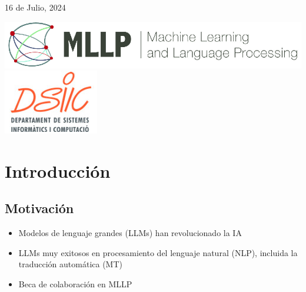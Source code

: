 \documentclass[landscape,spanish]{article}
\renewcommand{\today}{16 de Julio, 2024}
\begin{document}
\normalsize\small


\normalsize
\vspace{10mm}

\centerline{\color{greyblue} \today}
\vfill

\vspace{20mm}
\centerline{
	\includegraphics[height=0.1\textheight]{figures/MLLP_Brand} 
	\qquad 
	\qquad 
	\includegraphics[height=0.12\textheight]{figures/dsic.jpeg}
}

\vfill

\clearpage %

\hypertarget{INDEX}{}

\tableofcontents

\cp %
\section{Introducción}
\vspace*{10mm}

\subsection*{Motivación}
\vspace*{5mm}
\begin{itemize}\itemsep=5mm


    \item Modelos de lenguaje grandes (LLMs) han revolucionado la IA

    \item LLMs muy exitosos en procesamiento del lenguaje natural (NLP), incluida la traducción automática (MT)

    \item Beca de colaboración en MLLP

\end{itemize}
\end{document}
